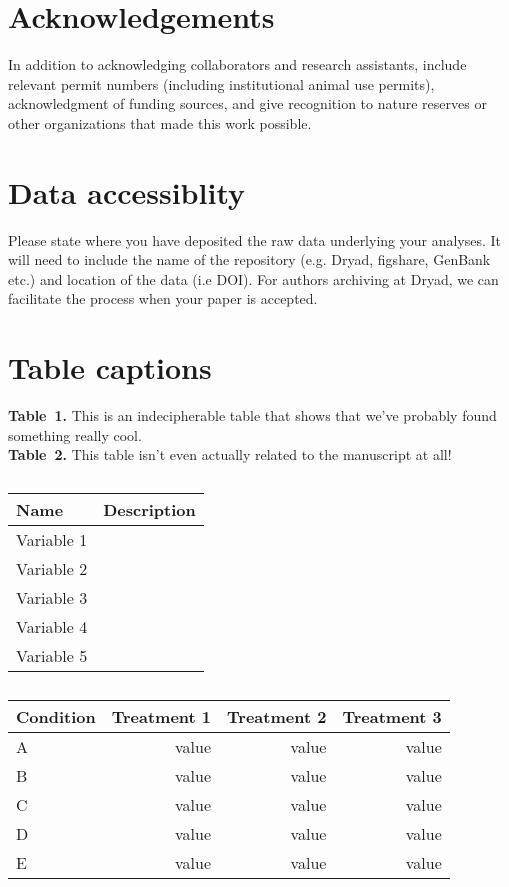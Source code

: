 \documentclass[12pt]{article}
\begin{document}
\section*{Acknowledgements}
In addition to acknowledging collaborators and research assistants, include relevant permit numbers (including institutional animal use permits), acknowledgment of funding sources, and give recognition to nature reserves or other organizations that made this work possible.
\section*{Data accessiblity}
Please state where you have deposited the raw data underlying your analyses. It will need to include the name of the repository (e.g. Dryad, figshare, GenBank etc.) and location of the data (i.e DOI). For authors archiving at Dryad, we can facilitate the process when your paper is accepted. \\
\newpage
\section*{Table captions}
\noindent \textbf{Table~1.} This is an indecipherable table that shows that we've probably found something really cool.\\
\noindent \textbf{Table~2.} This table isn't even actually related to the manuscript at all!
\newpage
\begin{table}[h!]
  \caption{}
  \label{TabVar}
  \begin{center}
    \begin{tabular}{p{3cm}p{10cm}}
      \hline
      Name & Description \\
      \hline
      Variable 1 \\
      Variable 2 \\
      Variable 3 \\
      Variable 4 \\
      Variable 5 \\
      \hline
    \end{tabular}
  \end{center}
\end{table}
\newpage
\begin{table}[h!]
  \caption{}
  \label{TabENFA}
  \begin{center}
    \begin{tabular}{lrrr}
      \hline
      Condition & Treatment 1 & Treatment 2 & Treatment 3 \\
      \hline
      A & value & value & value \\
      B & value & value & value \\
      C & value & value & value \\
      D & value & value & value \\
      E & value & value & value \\
      \hline
    \end{tabular}
  \end{center}
\end{table}
\newpage
\end{document}
